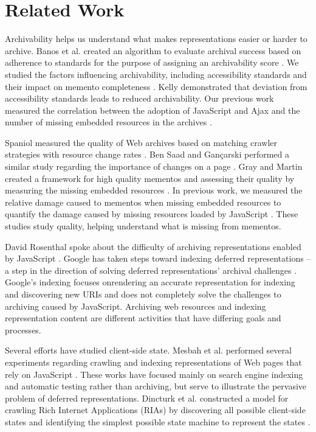 \documentclass{ipres_proc_article-sp}
\begin{document}
\section{Related Work}
\label{priorwork}
Archivability helps us understand what makes representations easier or harder to archive. Banos et al. created an algorithm to evaluate archival success based on adherence to standards for the purpose of assigning an archivability score \cite{ipresArchivability}. We studied the factors influencing archivability, including accessibility standards and their impact on memento completeness \cite{kellyTPDL2013}. Kelly demonstrated that deviation from accessibility standards leads to reduced archivability. Our previous work measured the correlation between the adoption of JavaScript and Ajax and the number of missing embedded resources in the archives \cite{ijdl}. 

Spaniol measured the quality of Web archives based on matching crawler strategies with resource change rates \cite{spaniol9catch, spaniol2009data, Denev:2009:SFQ:1687627.1687694}. Ben Saad and Gan\c{c}arski performed a similar study regarding the importance of changes on a page \cite{saad2011}. Gray and Martin created a framework for high quality mementos and assessing their quality by measuring the missing embedded resources \cite{mementoQuality}. In previous work, we measured the relative damage caused to mementos when missing embedded resources to quantify the damage caused by missing resources loaded by JavaScript \cite{brunelleDamage}. These studies study quality, helping understand what is missing from mementos.

David Rosenthal \cite{iipc2013} spoke about the difficulty of archiving representations enabled by JavaScript \cite{futureWeb}. Google has taken steps toward indexing deferred representations -- a step in the direction of solving deferred representations' archival challenges \cite{googleJS}. Google's indexing focuses onrendering an accurate representation for indexing and discovering new URIs and does not completely solve the challenges to archiving caused by JavaScript. Archiving web resources and indexing representation content are different activities that have differing goals and processes.

Several efforts have studied client-side state. Mesbah et al. performed several experiments regarding crawling and indexing representations of Web pages that rely on JavaScript \cite{mesbahCrawling, mesbahInferState}. These works have focused mainly on search engine indexing and automatic testing \cite{mesbahTesting, mesbah2} rather than archiving, but serve to illustrate the pervasive problem of deferred representations. Dincturk et al. constructed a model for crawling Rich Internet Applications (RIAs) by discovering all possible client-side states and identifying the simplest possible state machine to represent the states \cite{dincturkAjax}. 
\end{document}
